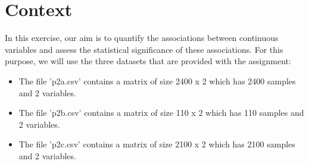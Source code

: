 \section*{Context}
In this exercise, our aim is to quantify the associations between continuous variables and assess the statistical significance of these associations. For this purpose, we will use the three datasets that are provided with the assignment:

\begin{itemize}
	\itemsep -0.3em 
	\item The file 'p2a.csv' contains a matrix of size 2400 x 2 which has 2400 samples and 2 variables. 
	\item The file 'p2b.csv' contains a matrix of size 110 x 2 which has 110 samples and 2 variables. 
	\item The file 'p2c.csv' contains a matrix of size 2100 x 2 which has 2100 samples and 2 variables. 
\end{itemize}

\newpage

